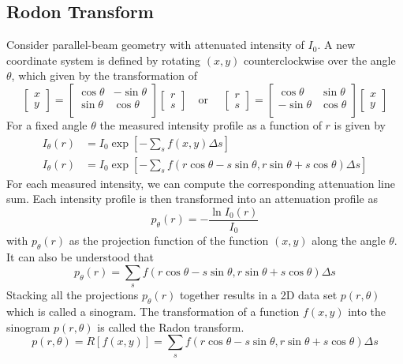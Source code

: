 \documentclass[../../../main.tex]{subfiles}
\begin{document}
\subsection{Rodon Transform}
Consider parallel-beam geometry with attenuated intensity of $I_0$.
A new coordinate system is defined by rotating $(x,y)$ counterclockwise over the angle $\theta$, which given by the transformation of 
\begin{equation*}
    \begin{bmatrix}
        x\\y
    \end{bmatrix}
    =
    \begin{bmatrix}
        \cos \theta& -\sin \theta\\
        \sin \theta & \cos \theta\\
    \end{bmatrix}
    \begin{bmatrix}
        r\\s
    \end{bmatrix}
    \quad \text{or }\quad
    \begin{bmatrix}
        r\\s
    \end{bmatrix}
    =
    \begin{bmatrix}
        \cos \theta& \sin \theta\\
        -\sin \theta & \cos \theta\\
    \end{bmatrix}
    \begin{bmatrix}
        x\\y
    \end{bmatrix}
\end{equation*}
For a fixed angle $\theta$ the measured intensity profile as a function of $r$ is given by
\begin{align*}
    I_\theta(r)&= I_0 \exp \left[ -\sum_s f(x,y)\Delta s \right] \\
    I_\theta(r)&= I_0 \exp \left[ -\sum_s f \left( r \cos \theta-s \sin \theta,r \sin \theta+s \cos \theta \right) \Delta s \right]
\end{align*}
For each measured intensity, we can compute the corresponding attenuation line sum.
Each intensity profile is then transformed into an attenuation profile as
\begin{equation*}
    p_\theta(r)=-\frac{\ln I_0(r )}{I_0}
\end{equation*}
with $p_\theta(r)$ as the projection function of the function $(x,y)$ along the angle $\theta$.
It can also be understood that 
\begin{equation*}
    p_\theta(r)=\sum_s f \left( r \cos \theta-s \sin \theta,r \sin \theta+s \cos \theta \right) \Delta s 
\end{equation*}
Stacking all the projections $p_\theta(r)$ together results in a 2D data set $p(r,\theta)$ which is called a sinogram.
The transformation of a function $f(x,y)$ into the sinogram $p(r,\theta)$ is called the Radon transform.
\begin{equation*}
    p(r,\theta)=R \left[ f(x,y) \right]=\sum_s f \left( r \cos \theta-s \sin \theta,r \sin \theta+s \cos \theta \right) \Delta s 
\end{equation*}
\end{document}
